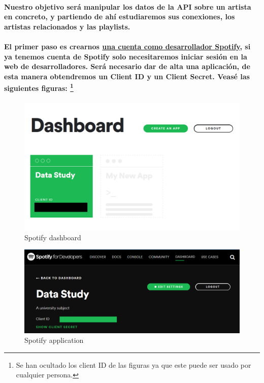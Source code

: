 \documentclass[11pt,spanish]{article}
\begin{document}
\paragraph*{Nuestro objetivo será manipular los datos de la API sobre un artista en concreto, y partiendo de ahí estudiaremos sus conexiones, los artistas relacionados y las playlists.}

\paragraph*{El primer paso es crearnos \href{https://developer.spotify.com/dashboard/applications}{una cuenta como desarrollador Spotify}, 
	si ya tenemos cuenta de Spotify solo necesitaremos iniciar sesión en la web de desarrolladores. Será necesario dar de alta una aplicación, de esta manera obtendremos un Client ID y un Client Secret.
	Veasé las siguientes figuras: \footnote{Se han ocultado los client ID de las figuras ya que este puede ser usado por cualquier persona.}}

\begin{figure}[h!]
    \centering
    \includegraphics[width=120mm]{spotify_dev_dashboard.png}
    \caption{Spotify dashboard}
\end{figure}

\begin{figure}[h!]
    \centering
	\includegraphics[width=120mm]{devoloper_spotify_1.png}
    \caption{Spotify application}
\end{figure}
\end{document}
